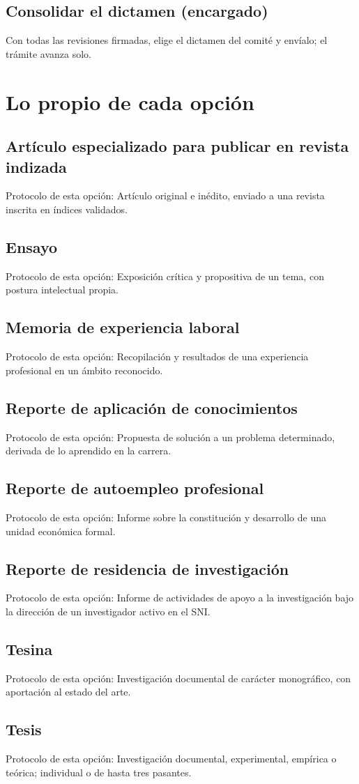 \subsection{Consolidar el dictamen (encargado)}
Con todas las revisiones firmadas, elige el dictamen del comité y envíalo; el trámite avanza solo.
\section{Lo propio de cada opción}
\subsection{Artículo especializado para publicar en revista indizada}
Protocolo de esta opción: Artículo original e inédito, enviado a una revista inscrita en índices validados.
\subsection{Ensayo}
Protocolo de esta opción: Exposición crítica y propositiva de un tema, con postura intelectual propia.
\subsection{Memoria de experiencia laboral}
Protocolo de esta opción: Recopilación y resultados de una experiencia profesional en un ámbito reconocido.
\subsection{Reporte de aplicación de conocimientos}
Protocolo de esta opción: Propuesta de solución a un problema determinado, derivada de lo aprendido en la carrera.
\subsection{Reporte de autoempleo profesional}
Protocolo de esta opción: Informe sobre la constitución y desarrollo de una unidad económica formal.
\subsection{Reporte de residencia de investigación}
Protocolo de esta opción: Informe de actividades de apoyo a la investigación bajo la dirección de un investigador activo en el SNI.
\subsection{Tesina}
Protocolo de esta opción: Investigación documental de carácter monográfico, con aportación al estado del arte.
\subsection{Tesis}
Protocolo de esta opción: Investigación documental, experimental, empírica o teórica; individual o de hasta tres pasantes.
